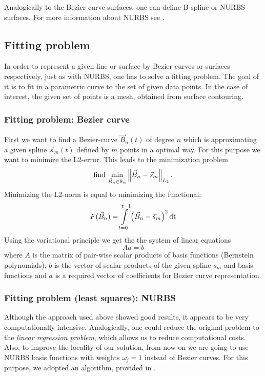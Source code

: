 Analogically to the Bezier curve surfaces, one can define B-spline or NURBS surfaces. For more information about NURBS see \cite{farin1999nurbs}.
\subsection{Fitting problem}
In order to represent a given line or surface by Bezier curves or surfaces respectively, just as with NURBS, one has to solve a fitting problem. The goal of it is to fit in a parametric curve to the set of given data points. In the case of interest, the given set of points is a mesh, obtained from surface contouring.
\subsubsection{Fitting problem: Bezier curve}
First we want to find a Bezier-curve $\vec{B}_n\left(t\right)$ of degree $n$ which is approximating a given spline $\vec{s}_m\left(t\right)$ defined by $m$ points in a optimal way. For this purpose we want to minimize the L2-error. This leads to the minimization problem
\begin{equation}
\text{find\ } \underset{\vec{B}_n\in \mathbb{B}_n}{\min} \Ltwonorm{\vec{B}_n-\vec{s}_m}.
\end{equation}
Minimizing the L2-norm is equal to minimizing the functional:
\begin{equation}
F(\vec{B}_n)=\int\limits_{t=0}^{t=1} \left(\vec{B}_n-\vec{s}_m\right)^2\dt
\end{equation}
Using the variational principle we get the the system of linear equations
\begin{equation}
A a = b
\end{equation}
where $A$ is the matrix of pair-wise scalar products of basis functions (Bernstein polynomials), $b$ is the vector of scalar products of the given spline $s_{m}$ and basis functions and $a$ is a required vector of coefficients for Bezier curve representation.

\subsubsection{Fitting problem (least squares): NURBS}
Although the approach used above showed good results, it appears to be very computationally intensive. Analogically, one could reduce the original problem to the \textit{linear regression problem}, which allows us to reduce computational costs. Also, to improve the locality of our solution, from now on we are going to use NURBS basis functions with weights $\omega_{j} = 1$ instead of Bezier curves. For this purpose, we adopted an algorithm, provided in \cite{becker2011advanced}.


